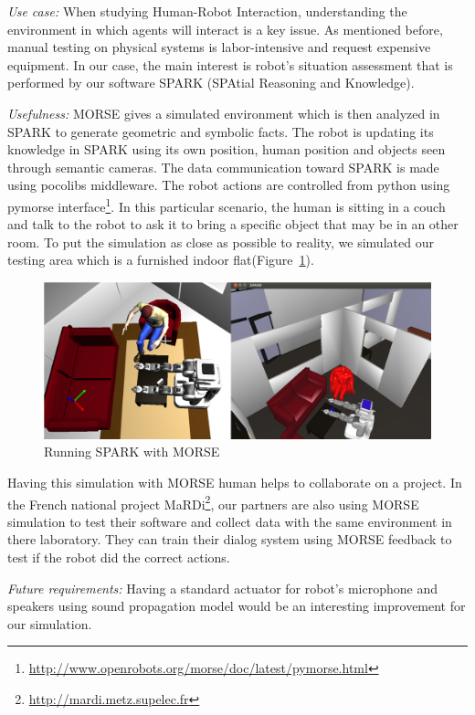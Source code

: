 \documentclass[conference]{IEEEtran}
\begin{document}
\emph{Use case:} When studying Human-Robot Interaction, understanding the environment in which
agents will interact is a key issue. As mentioned before, manual testing on
physical systems is labor-intensive and request expensive equipment.
In our case, the main interest is robot's situation assessment that is performed 
by our software SPARK (SPAtial Reasoning and Knowledge). 

\emph{Usefulness:} MORSE gives a simulated environment which is then analyzed in
 SPARK to generate geometric and symbolic facts. The robot is updating its
knowledge in SPARK using its own position, human position and objects seen through
semantic cameras. The data communication toward SPARK is made using pocolibs
middleware. The robot actions are controlled from python using pymorse
interface\footnote{\url{http://www.openrobots.org/morse/doc/latest/pymorse.html}}.
In this particular scenario, the human is sitting in a couch and talk to the
robot to ask it to bring a specific object that may be in an other room.
To put the simulation as close as possible to reality, we simulated our testing
area which is a furnished indoor flat(Figure~\ref{fig|spark}).

\begin{figure}[H]
      \centering
      \includegraphics[width=0.9\linewidth]{morsespark.png}
      \caption{Running SPARK with MORSE}
      \label{fig|spark}
\end{figure}

Having this simulation with MORSE human helps to collaborate on a project.
In the French national project MaRDi\footnote{\url{http://mardi.metz.supelec.fr}},
our partners are also using MORSE simulation to test their software and collect 
data with the same environment in there laboratory.
They can train their dialog system using MORSE feedback to test if the robot
did the correct actions.

\emph{Future requirements:}
Having a standard actuator for robot's microphone and speakers using sound
propagation model would be an interesting improvement for our simulation.
\end{document}
